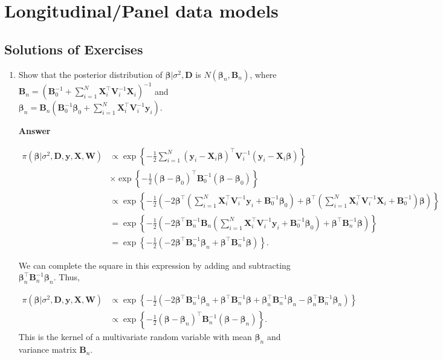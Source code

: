 \chapter{Longitudinal/Panel data models}\label{chap9}

\section*{Solutions of Exercises}\label{sec91}
\begin{enumerate}[leftmargin=*]

	\item Show that the posterior distribution of $\bm{\beta}|\sigma^2,\bm{D}$ is $N(\bm{\beta}_n,\bm{B}_n)$, where $\bm{B}_n = (\bm{B}_0^{-1} +\sum_{i=1}^N \bm{X}_i^{\top}\bm{V}_i^{-1}\bm{X}_i)^{-1}$ and $\bm{\beta}_n= \bm{B}_n(\bm{B}_0^{-1}\bm{\beta}_0 + \sum_{i=1}^N\bm{X}_i^{\top}\bm{V}_i^{-1}\bm{y}_i)$.
	
	\textbf{Answer}

{\footnotesize	
	\begin{align*}
		\pi(\bm{\beta}|\sigma^2, \bm{D},\bm{y},\bm{X},\bm{W}) & \propto \exp\left\{-\frac{1}{2}\sum_{i=1}^N(\bm{y}_i-\bm{X}_i\bm{\beta})^{\top}\bm{V}_i^{-1}(\bm{y}_i-\bm{X}_i\bm{\beta})\right\}\\
		&\times \exp\left\{-\frac{1}{2}(\bm{\beta}-\bm{\beta}_0)^{\top}\bm{B}_0^{-1}(\bm{\beta}-\bm{\beta}_0)\right\}\\
		& \propto \exp\left\{-\frac{1}{2}\left(-2\bm{\beta}^{\top}\left(\sum_{i=1}^N\bm{X}_i^{\top}\bm{V}_i^{-1}\bm{y}_i+\bm{B}_0^{-1}\bm{\beta}_0\right)+\bm{\beta}^{\top}\left(\sum_{i=1}^N\bm{X}_i^{\top}\bm{V}_i^{-1}\bm{X}_i+\bm{B}_0^{-1}\right)\bm{\beta}\right)\right\}\\
		& = \exp\left\{-\frac{1}{2}(-2\bm{\beta}^{\top}\bm{B}_n^{-1}\bm{B}_n\left(\sum_{i=1}^N\bm{X}_i^{\top}\bm{V}_i^{-1}\bm{y}_i+\bm{B}_0^{-1}\bm{\beta}_0\right)+\bm{\beta}^{\top}\bm{B}_n^{-1}\bm{\beta})\right\}\\
		& = \exp\left\{-\frac{1}{2}(-2\bm{\beta}^{\top}\bm{B}_n^{-1}\bm{\beta}_n+\bm{\beta}^{\top}\bm{B}_n^{-1}\bm{\beta})\right\}. 
	\end{align*} 
}

We can complete the square in this expression by adding and subtracting $\bm{\beta}_n^{\top}\bm{B}_n^{-1}\bm{\beta}_n$. Thus,

	\begin{align*}
	\pi(\bm{\beta}|\sigma^2, \bm{D},\bm{y},\bm{X},\bm{W}) & \propto \exp\left\{-\frac{1}{2}(-2\bm{\beta}^{\top}\bm{B}_n^{-1}\bm{\beta}_n+\bm{\beta}^{\top}\bm{B}_n^{-1}\bm{\beta}+\bm{\beta}_n^{\top}\bm{B}_n^{-1}\bm{\beta}_n-\bm{\beta}_n^{\top}\bm{B}_n^{-1}\bm{\beta}_n)\right\}\\
	&\propto \exp\left\{-\frac{1}{2}(\bm{\beta}-\bm{\beta}_n)^{\top}\bm{B}_n^{-1}(\bm{\beta}-\bm{\beta}_n)\right\}.
\end{align*} 
This is the kernel of a multivariate random variable with mean $\bm{\beta}_n$ and variance matrix $\bm{B}_n$.
	

\end{enumerate}
